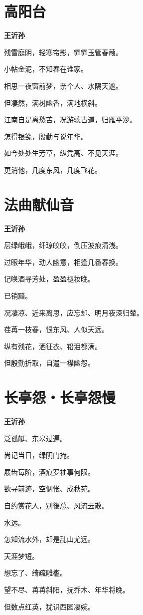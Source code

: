 \documentclass[12pt,a4paper]{ctexbook}
\begin{document}
\section{高阳台}
\textbf{王沂孙}\par\vspace{0.5em}
残雪庭阴，轻寒帘影，霏霏玉管春葭。\par
小帖金泥，不知春在谁家。\par
相思一夜窗前梦，奈个人、水隔天遮。\par
但凄然，满树幽香，满地横斜。\par
江南自是离愁苦，况游骢古道，归雁平沙。\par
怎得银笺，殷勤与说年华。\par
如今处处生芳草，纵凭高、不见天涯。\par
更消他，几度东风，几度飞花。\par

\section{法曲献仙音}
\textbf{王沂孙}\par\vspace{0.5em}
层绿峨峨，纤琼皎皎，倒压波痕清浅。\par
过眼年华，动人幽意，相逢几番春换。\par
记唤酒寻芳处，盈盈褪妆晚。\par
已销黯。\par
况凄凉、近来离思，应忘却、明月夜深归辇。\par
荏苒一枝春，恨东风、人似天远。\par
纵有残花，洒征衣、铅泪都满。\par
但殷勤折取，自遣一襟幽怨。\par

\section{长亭怨・长亭怨慢}
\textbf{王沂孙}\par\vspace{0.5em}
泛孤艇、东皋过遍。\par
尚记当日，绿阴门掩。\par
屐齿莓阶，酒痕罗袖事何限。\par
欲寻前迹，空惆怅、成秋苑。\par
自约赏花人，别後总、风流云散。\par
水远。\par
怎知流水外，却是乱山尤远。\par
天涯梦短。\par
想忘了、绮疏雕槛。\par
望不尽、苒苒斜阳，抚乔木、年华将晚。\par
但数点红英，犹识西园凄婉。\par
\end{document}
